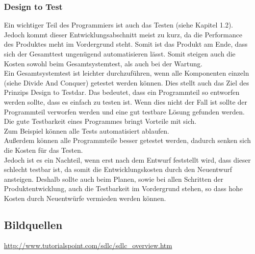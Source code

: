 \documentclass[a4paper, 10pt]{scrartcl}
\begin{document}
\subsubsection{Design to Test}
Ein wichtiger Teil des Programmiers ist auch das Testen (siehe Kapitel 1.2). Jedoch kommt dieser Entwicklungsabschnitt meist zu kurz, da die Performance des Produktes meht  im Vordergrund steht. Somit ist das Produkt am Ende, dass sich der Gesamttest ungenügend automatisieren lässt. Somit steigen auch die Kosten sowohl beim Gesamtsystemtest, als auch bei der Wartung.\\
Ein Gesamtsystemtest ist leichter durchzuführen, wenn alle Komponenten einzeln (siehe \glqq Divide And Conquer\grqq) getestet werden können. Dies stellt auch das Ziel des Prinzips \glqq Design to Test\grqq dar. Das bedeutet, dass ein Programmteil so entworfen werden sollte, dass es einfach zu testen ist. Wenn dies nicht der Fall ist sollte der Programmteil verworfen werden und eine gut testbare Lösung gefunden werden.\\
Die gute Testbarkeit eines Programmes bringt Vorteile mit sich.\\
Zum Beispiel können alle Tests automatisiert ablaufen.\\
Außerdem können alle Programmteile besser getestet werden, dadurch senken sich die Kosten für das Testen.\\
Jedoch ist es ein Nachteil, wenn erst nach dem Entwurf feststellt wird, dass dieser schlecht testbar ist, da somit die Entwicklungskosten durch den Neuentwurf ansteigen. Deshalb sollte auch beim Planen, sowie bei allen Schritten der Produktentwicklung, auch die Testbarkeit im Vordergrund stehen, so dass hohe Kosten durch Neuentwürfe vermieden werden können. \citep{goll_entwurfsprinzipien}

\subsection{Bildquellen}
\url{http://www.tutorialspoint.com/sdlc/sdlc_overview.htm}

\newpage

\end{document}
